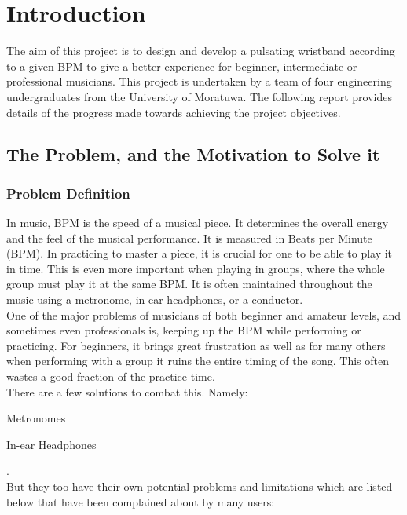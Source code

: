 \documentclass{article}
\begin{document}
        \newpage
        \tableofcontents
	\newpage
	
        \section{Introduction}
        The aim of this project is to design and develop a pulsating wristband according to a given BPM to give a better experience for beginner, intermediate or professional musicians. This project is undertaken by a team of four engineering undergraduates from the University of Moratuwa. The following report provides details of the progress made towards achieving the project objectives.
        
        \subsection{The Problem, and the Motivation to Solve it}
        \subsubsection{Problem Definition}
        In music, BPM is the speed of a musical piece. It determines the overall energy and the feel of the musical performance. It is measured in Beats per Minute (BPM). In practicing to master a piece, it is crucial for one to be able to play it in time. This is even more important when playing in groups, where the whole group must play it at the same BPM. It is often maintained throughout the music using a metronome, in-ear headphones, or a conductor.\\

        One of the major problems of musicians of both beginner and amateur levels, and sometimes even professionals is, keeping up the BPM while performing or practicing. For beginners, it brings great frustration as well as for many others when performing with a group it ruins the entire timing of the song. This often wastes a good fraction of the practice time.\\

        There are a few solutions to combat this. Namely:
        \begin{compactitem}
                \item Metronomes
                \item In-ear Headphones
        \end{compactitem}
        .\\
        But they too have their own potential problems and limitations which are listed below that have been complained about by many users:
\end{document}
